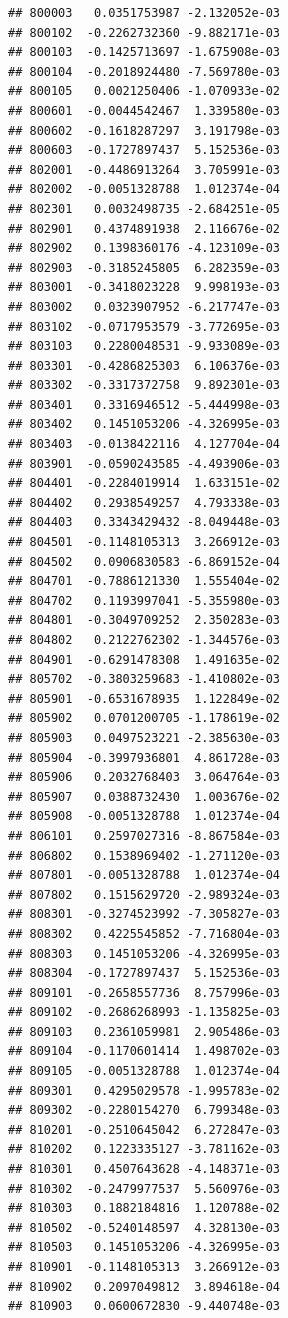 \begin{frame}[fragile]
\begin{verbatim}
## 800003   0.0351753987 -2.132052e-03
## 800102  -0.2262732360 -9.882171e-03
## 800103  -0.1425713697 -1.675908e-03
## 800104  -0.2018924480 -7.569780e-03
## 800105   0.0021250406 -1.070933e-02
## 800601  -0.0044542467  1.339580e-03
## 800602  -0.1618287297  3.191798e-03
## 800603  -0.1727897437  5.152536e-03
## 802001  -0.4486913264  3.705991e-03
## 802002  -0.0051328788  1.012374e-04
## 802301   0.0032498735 -2.684251e-05
## 802901   0.4374891938  2.116676e-02
## 802902   0.1398360176 -4.123109e-03
## 802903  -0.3185245805  6.282359e-03
## 803001  -0.3418023228  9.998193e-03
## 803002   0.0323907952 -6.217747e-03
## 803102  -0.0717953579 -3.772695e-03
## 803103   0.2280048531 -9.933089e-03
## 803301  -0.4286825303  6.106376e-03
## 803302  -0.3317372758  9.892301e-03
## 803401   0.3316946512 -5.444998e-03
## 803402   0.1451053206 -4.326995e-03
## 803403  -0.0138422116  4.127704e-04
## 803901  -0.0590243585 -4.493906e-03
## 804401  -0.2284019914  1.633151e-02
## 804402   0.2938549257  4.793338e-03
## 804403   0.3343429432 -8.049448e-03
## 804501  -0.1148105313  3.266912e-03
## 804502   0.0906830583 -6.869152e-04
## 804701  -0.7886121330  1.555404e-02
## 804702   0.1193997041 -5.355980e-03
## 804801  -0.3049709252  2.350283e-03
## 804802   0.2122762302 -1.344576e-03
## 804901  -0.6291478308  1.491635e-02
## 805702  -0.3803259683 -1.410802e-03
## 805901  -0.6531678935  1.122849e-02
## 805902   0.0701200705 -1.178619e-02
## 805903   0.0497523221 -2.385630e-03
## 805904  -0.3997936801  4.861728e-03
## 805906   0.2032768403  3.064764e-03
## 805907   0.0388732430  1.003676e-02
## 805908  -0.0051328788  1.012374e-04
## 806101   0.2597027316 -8.867584e-03
## 806802   0.1538969402 -1.271120e-03
## 807801  -0.0051328788  1.012374e-04
## 807802   0.1515629720 -2.989324e-03
## 808301  -0.3274523992 -7.305827e-03
## 808302   0.4225545852 -7.716804e-03
## 808303   0.1451053206 -4.326995e-03
## 808304  -0.1727897437  5.152536e-03
## 809101  -0.2658557736  8.757996e-03
## 809102  -0.2686268993 -1.135825e-03
## 809103   0.2361059981  2.905486e-03
## 809104  -0.1170601414  1.498702e-03
## 809105  -0.0051328788  1.012374e-04
## 809301   0.4295029578 -1.995783e-02
## 809302  -0.2280154270  6.799348e-03
## 810201  -0.2510645042  6.272847e-03
## 810202   0.1223335127 -3.781162e-03
## 810301   0.4507643628 -4.148371e-03
## 810302  -0.2479977537  5.560976e-03
## 810303   0.1882184816  1.120788e-02
## 810502  -0.5240148597  4.328130e-03
## 810503   0.1451053206 -4.326995e-03
## 810901  -0.1148105313  3.266912e-03
## 810902   0.2097049812  3.894618e-04
## 810903   0.0600672830 -9.440748e-03

\end{verbatim}
\end{frame}

